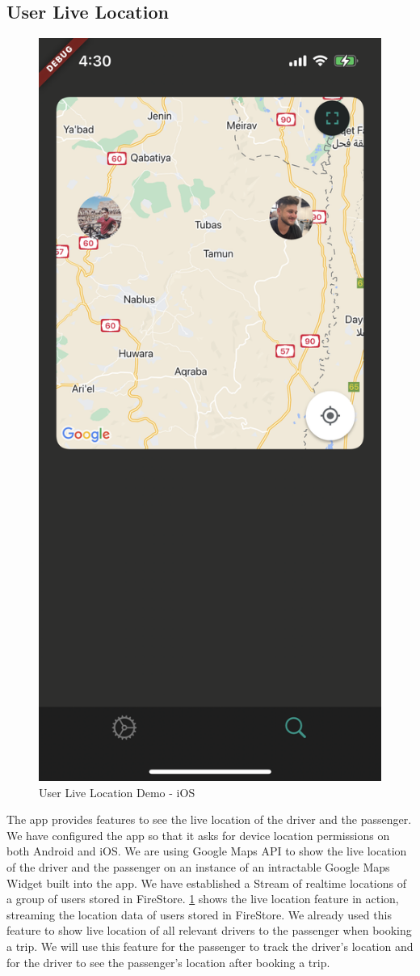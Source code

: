 \documentclass[a4paper, 12pt]{report} %
\begin{document}
        \subsection{User Live Location}
            \begin{figure}
                \centering
                \includegraphics[width=0.65\linewidth]{Images/live_location.png}
                \caption{User Live Location Demo - iOS}
                \label{fig:live_location_demo}
            \end{figure}
            The app provides features to see the live location of the driver and the passenger. We have configured the app so that it asks for device location permissions on both Android and iOS. We are using Google Maps API to show the live location of the driver and the passenger on an instance of an intractable Google Maps Widget built into the app. We have established a Stream of realtime locations of a group of users stored in FireStore. \ref{fig:live_location_demo} shows the live location feature in action, streaming the location data of users stored in FireStore. We already used this feature to show live location of all relevant drivers to the passenger when booking a trip. We will use this feature for the passenger to track the driver's location and for the driver to see the passenger's location after booking a trip.
\end{document}
